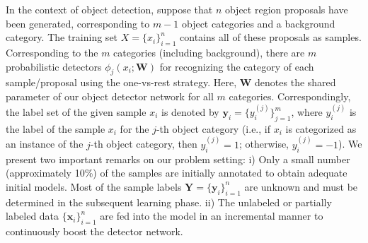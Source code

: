 \documentclass[journal]{IEEEtran}
\begin{document}
In the context of object detection, suppose that $n$ object region proposals have been generated, corresponding to $m-1$ object categories and a background category. The training set $X=\{x_{i}\}_{i=1}^{n}$ contains all of these proposals as samples. Corresponding to the $m$ categories (including background), there are $m$ probabilistic detectors $\phi_j(x_i; \mathbf{W})$ for recognizing the category of each sample/proposal using the one-vs-rest strategy. Here, $\mathbf{W}$ denotes the shared parameter of our object detector network for all $m$ categories. Correspondingly, the label set of {the given sample} $x_i$ is denoted by $\mathbf{y}_i = \{y_i^{(j)}\}_{j=1}^m$, where $y_{i}^{(j)}$ is the label of {the} sample $x_i$ for the $j$-th object category (i.e., if $x_{i}$ is categorized as an instance of the $j$-th object category, then $y_{i}^{(j)}=1$; otherwise, $y_{i}^{(j)}=-1$). We present two important remarks on our problem setting: i) Only a small number (approximately 10\%) of the samples are initially annotated to obtain adequate initial models. Most of the sample labels $\mathbf{Y} = \{\mathbf{y}_i\}_{i=1}^n$ are unknown and must be determined in the subsequent learning phase. ii) The unlabeled or partially labeled data $\{\mathbf{x}_i\}_{i=1}^n$ are fed into the model in an incremental manner {to continuously boost the detector network.} 
\end{document}
